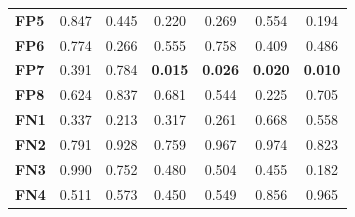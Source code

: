 \begin{table}
\begin{tabular}{lccc|ccc}
        \textbf{FP5}  & 0.847                                   & 0.445                                             & 0.220                                  & 0.269                                    & 0.554                                  & 0.194                                  \\
        \textbf{FP6}  & 0.774                                   & 0.266                                             & 0.555                                  & 0.758                                    & 0.409                                  & 0.486                                  \\
        \textbf{FP7}  & 0.391                                   & 0.784                                             & \cellcolor[HTML]{EFEFEF}\textbf{0.015} & \cellcolor[HTML]{EFEFEF}\textbf{0.026}   & \cellcolor[HTML]{EFEFEF}\textbf{0.020} & \cellcolor[HTML]{EFEFEF}\textbf{0.010} \\
        \textbf{FP8}  & 0.624                                   & 0.837                                             & 0.681                                  & 0.544                                    & 0.225                                  & 0.705                                  \\
        \textbf{FN1}  & 0.337                                   & 0.213                                             & 0.317                                  & 0.261                                    & 0.668                                  & 0.558                                  \\
        \textbf{FN2}  & 0.791                                   & 0.928                                             & 0.759                                  & 0.967                                    & 0.974                                  & 0.823                                  \\
        \textbf{FN3}  & 0.990                                   & 0.752                                             & 0.480                                  & 0.504                                    & 0.455                                  & 0.182                                  \\
        \textbf{FN4}  & 0.511                                   & 0.573                                             & 0.450                                  & 0.549                                    & 0.856                                  & 0.965                                  \\

\end{tabular}
\end{table}
